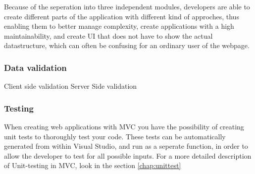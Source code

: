 Because of the seperation into three independent modules, developers are able to create different parts of the application with different kind of approches, thus enabling them to better manage complexity, create applications with a high maintainability, and create UI that does not have to show the actual datastructure, which can often be confusing for an ordinary user of the webpage.

\subsubsection{Data validation}
Client side validation
Server Side validation

\subsubsection{Testing}
When creating web applications with MVC you have the possibility of creating unit tests to thoroughly test your code. These tests can be automatically generated from within Visual Studio, and run as a seperate function, in order to allow the developer to test for all possible inputs. For a more detailed description of Unit-testing in MVC, look in the section \ref{chap:unittest}

\cite{mvcconcept} \cite{mvcxeroxparc} \cite{aspdotnet}



